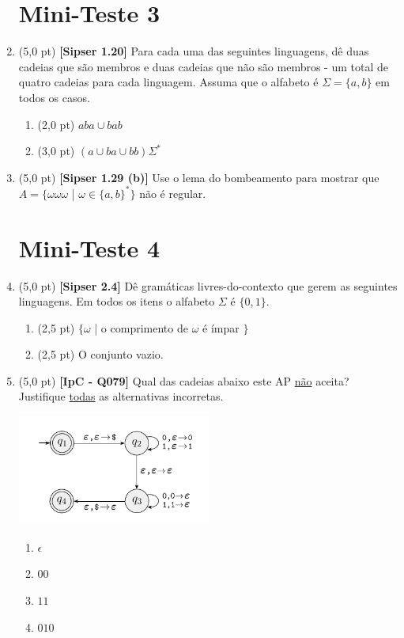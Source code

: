 \documentclass[12pt,a4paper,oneside]{article}
\begin{document}
\begin{enumerate}
	
	\section*{Mini-Teste 3}
	
	\item (5,0 pt) {\bf [Sipser 1.20]} Para cada uma das seguintes linguagens, dê duas cadeias que são membros e duas cadeias que não são membros - um total de quatro cadeias para cada linguagem. Assuma que o alfabeto é $\Sigma = \{a,b\}$ em todos os casos.
	\begin{enumerate}
		\item (2,0 pt) $aba \cup bab$ 
		\item (3,0 pt) $(a \cup ba \cup bb)\Sigma^*$
	\end{enumerate}
	
	\item (5,0 pt) {\bf [Sipser 1.29 (b)]} Use o lema do bombeamento para mostrar que $A = \{\omega \omega \omega$ | $\omega \in \{a, b\}^* \}$ não é regular.

	\section*{Mini-Teste 4}

	\item (5,0 pt) {\bf [Sipser 2.4]}  Dê gramáticas livres-do-contexto que gerem as seguintes linguagens. Em todos os itens o alfabeto $\Sigma$ é $\{0,1\}$.
	\begin{enumerate}
		\item (2,5 pt) $\{\omega$ | o comprimento de $\omega$ é ímpar $\}$
		\item (2,5 pt) O conjunto vazio.
	\end{enumerate}

	\item (5,0 pt) {\bf [IpC - Q079]} Qual das cadeias abaixo este AP \underline{não} aceita? Justifique \underline{todas} as alternativas incorretas.
	
	\begin{center}
		\includegraphics[width=0.5\textwidth]{images/ap3}
	\end{center}

\begin{enumerate}
\item $\epsilon$
\item $00$
\item $11$
\item $010$
\end{enumerate}

\end{enumerate}
\end{document}
